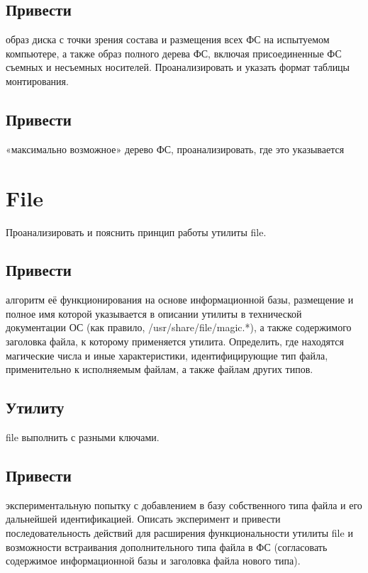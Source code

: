 \documentclass[a4paper]{article}
\begin{document}
\subsection{ Привести} образ диска с точки зрения состава и размещения всех ФС на испытуемом компьютере, а также образ полного дерева ФС, включая присоединенные ФС съемных и несъемных носителей. Проанализировать и указать формат таблицы монтирования.
\subsection{ Привести} «максимально возможное» дерево ФС, проанализировать, где это указывается

\section{ File} Проанализировать и пояснить принцип работы утилиты file.  
\subsection{ Привести} алгоритм её функционирования на основе информационной базы, размещение и полное имя которой указывается в описании утилиты в технической документации ОС (как правило, /usr/share/file/magic.*), а также содержимого заголовка файла, к которому применяется утилита. Определить, где находятся магические числа и иные характеристики, идентифицирующие тип файла, применительно к исполняемым файлам, а также файлам других типов. 
\subsection{ Утилиту} file выполнить с разными ключами. 
\subsection{ Привести} экспериментальную попытку с добавлением в базу собственного типа файла и его дальнейшей идентификацией. Описать эксперимент и привести последовательность действий для расширения функциональности утилиты file и возможности встраивания дополнительного типа файла в ФС (согласовать содержимое информационной базы и заголовка файла нового типа).
\end{document}
